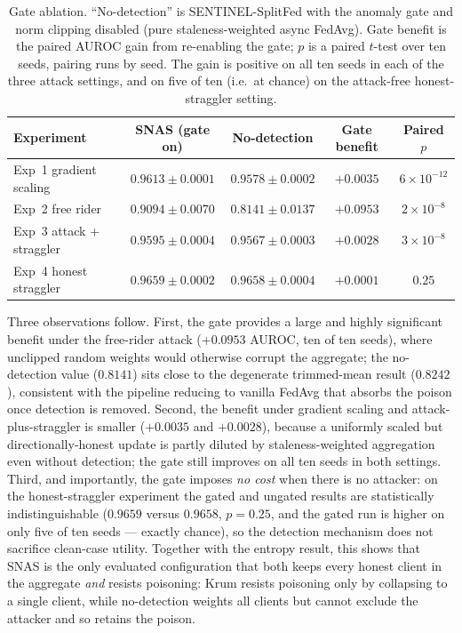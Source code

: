 \documentclass[pdflatex,sn-mathphys-num]{sn-jnl}
\begin{document}
\begin{table}[t]
\caption{Gate ablation. ``No-detection'' is SENTINEL-SplitFed with the anomaly gate and norm clipping disabled (pure staleness-weighted async FedAvg). Gate benefit is the paired AUROC gain from re-enabling the gate; $p$ is a paired $t$-test over ten seeds, pairing runs by seed. The gain is positive on all ten seeds in each of the three attack settings, and on five of ten (i.e.\ at chance) on the attack-free honest-straggler setting.}
\label{tab:ablation}
\centering
\begin{tabular}{lcccc}
\toprule
Experiment & SNAS (gate on) & No-detection & Gate benefit & Paired $p$ \\
\midrule
Exp~1 gradient scaling & $0.9613\pm0.0001$ & $0.9578\pm0.0002$ & $+0.0035$ & $6\times10^{-12}$ \\
Exp~2 free rider & $0.9094\pm0.0070$ & $0.8141\pm0.0137$ & $+0.0953$ & $2\times10^{-8}$ \\
Exp~3 attack + straggler & $0.9595\pm0.0004$ & $0.9567\pm0.0003$ & $+0.0028$ & $3\times10^{-8}$ \\
Exp~4 honest straggler & $0.9659\pm0.0002$ & $0.9658\pm0.0004$ & $+0.0001$ & $0.25$ \\
\bottomrule
\end{tabular}
\end{table}

Three observations follow. First, the gate provides a large and highly significant benefit under the free-rider attack ($+0.0953$ AUROC, ten of ten seeds), where unclipped random weights would otherwise corrupt the aggregate; the no-detection value ($0.8141$) sits close to the degenerate trimmed-mean result ($0.8242$), consistent with the pipeline reducing to vanilla FedAvg that absorbs the poison once detection is removed. Second, the benefit under gradient scaling and attack-plus-straggler is smaller ($+0.0035$ and $+0.0028$), because a uniformly scaled but directionally-honest update is partly diluted by staleness-weighted aggregation even without detection; the gate still improves on all ten seeds in both settings. Third, and importantly, the gate imposes \emph{no cost} when there is no attacker: on the honest-straggler experiment the gated and ungated results are statistically indistinguishable ($0.9659$ versus $0.9658$, $p=0.25$, and the gated run is higher on only five of ten seeds --- exactly chance), so the detection mechanism does not sacrifice clean-case utility. Together with the entropy result, this shows that SNAS is the only evaluated configuration that both keeps every honest client in the aggregate \emph{and} resists poisoning: Krum resists poisoning only by collapsing to a single client, while no-detection weights all clients but cannot exclude the attacker and so retains the poison.
\end{document}
